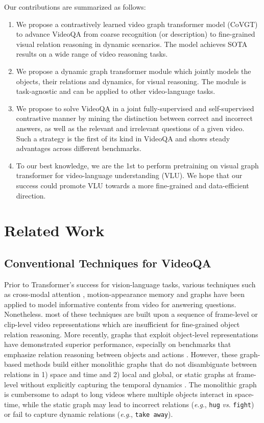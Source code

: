 \documentclass[10pt,journal,compsoc]{IEEEtran}
\newcommand{\vs}{\textit{vs}. }
\newcommand{\eg}{\textit{e}.\textit{g}.}
\begin{document}
Our contributions are summarized as follows:
\begin{enumerate}
    \item We propose a contrastively learned video graph transformer model (CoVGT) to advance VideoQA from coarse recognition (or description) to fine-grained visual relation reasoning in dynamic scenarios. The model achieves SOTA results on a wide range of video reasoning tasks.
     \item We propose a dynamic graph transformer module which jointly models the objects, their relations and dynamics, for visual reasoning. The module is task-agnostic and can be applied to other video-language tasks.
    \item We propose to solve VideoQA in a joint fully-supervised and self-supervised contrastive manner by mining the distinction between correct and incorrect answers, as well as the relevant and irrelevant questions of a given video. Such a strategy is the first of its kind in VideoQA and shows steady advantages across different benchmarks. 
    \item To our best knowledge, we are the 1st to perform pretraining on visual graph transformer for video-language understanding (VLU). We hope that our success could promote VLU towards a more fine-grained and data-efficient direction.
\end{enumerate}

 \section{Related Work}
\label{sec:rw}
\subsection{Conventional Techniques for VideoQA}
Prior to Transformer's success for vision-language tasks, various techniques such as cross-modal attention \cite{jang2017tgif,li2019beyond,jiang2020divide}, motion-appearance memory \cite{gao2018motion,fan2019heterogeneous,liu2021hair} and graphs \cite{jiang2020reasoning,park2021bridge} have been applied to model informative contents from video for answering questions. Nonetheless. most of these techniques are built upon a sequence of frame-level or clip-level video representations which are insufficient for fine-grained object relation reasoning. More recently, graphs that exploit object-level representations \cite{dang2021hierarchical,huang2020location,liu2021hair,peng2021progressive,seo2021attend,xiao2020visual,xiao2021video,xiao2022rethinking} have demonstrated superior performance, especially on benchmarks that emphasize relation reasoning between objects and actions \cite{jang2017tgif,xiao2021next}. 
However, these graph-based methods build either monolithic graphs \cite{huang2020location} that do not disambiguate between relations in 1) space and time and 2) local and global, or static graphs at frame-level without explicitly capturing the temporal dynamics \cite{xiao2021video,peng2021progressive,liu2021hair}. The monolithic graph is cumbersome to adapt to long videos where multiple objects interact in space-time, while the static graph may lead to incorrect relations (\eg, \texttt{hug} \vs \texttt{fight}) or fail to capture dynamic relations (\eg, \texttt{take away}). 
\end{document}

